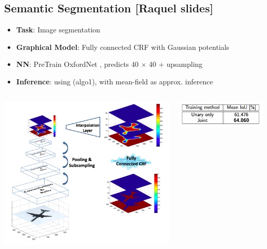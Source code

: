 \documentclass{beamer}
\begin{document}
\subsection*{Semantic Segmentation [Raquel slides]}
	\begin{frame}
			\begin{itemize}
				\item \textbf{Task}: Image segmentation
				\item \textbf{Graphical Model}: Fully connected CRF with Gaussian potentials
				\item \textbf{NN}: PreTrain OxfordNet , predicts 40 $\times$ 40 + upsampling
				\item \textbf{Inference}: using (algo1), with mean-field as approx. inference
			\end{itemize}
			
			\begin{columns}[onlytextwidth]
				\begin{column}{0.5\textwidth}
					\begin{center}
						\includegraphics[scale=0.17]{img/ex3}
					\end{center}
				\end{column}
				\begin{column}{0.5\textwidth}
					\begin{center}
						\includegraphics[scale=0.28]{img/ex3_1}
					\end{center}
				\end{column}
			\end{columns}
	\end{frame}
\end{document}
